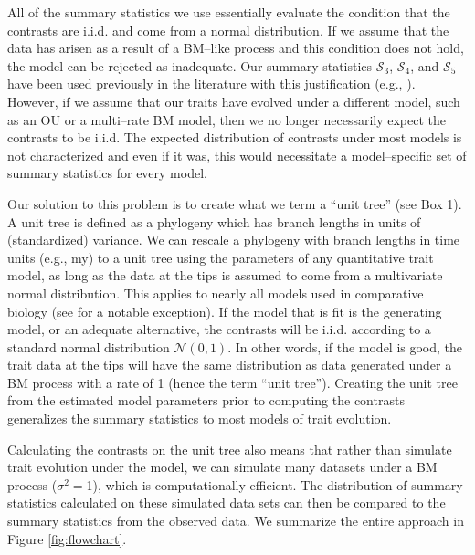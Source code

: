 \documentclass[a4paper,12pt]{article}
\begin{document}
All of the summary statistics we use essentially evaluate the condition that the contrasts are i.i.d. and come from a normal distribution. If we assume that the data has arisen as a result of a BM--like process and this condition does not hold, the model can be rejected as inadequate. Our summary statistics $\mathcal{S}_3$, $\mathcal{S}_4$, and $\mathcal{S}_5$ have been used previously in the literature with this justification (e.g., \citep{Garland1992, Garland1993,  Diaz1996}). However, if we assume that our traits have evolved under a different model, such as an OU or a multi--rate BM model, then we no longer necessarily expect the contrasts to be i.i.d. The expected distribution of contrasts under most models is not characterized and even if it was, this would necessitate a model--specific set of summary statistics for every model.

Our solution to this problem is to create what we term a ``unit tree'' (see Box 1). A unit tree is defined as a phylogeny which has branch lengths in units of (standardized) variance. We can rescale a phylogeny with branch lengths in time units (e.g., my) to a unit tree using the parameters of any quantitative trait model, as long as the data at the tips is assumed to come from a multivariate normal distribution. This applies to nearly all models used in comparative biology \citep{Omeara2012} (see \citep{Landis2012} for a notable exception). If the model that is fit is the generating model, or an adequate alternative, the contrasts will be i.i.d. according to a standard normal distribution $\mathcal{N}(0,1)$. In other words, if the model is good, the trait data at the tips will have the same distribution as data generated under a BM process with a rate of 1 (hence the term ``unit tree''). Creating the unit tree from the estimated model parameters prior to computing the contrasts generalizes the summary statistics to most models of trait evolution.

Calculating the contrasts on the unit tree also means that rather than simulate trait evolution under the model, we can simulate many datasets under a BM process ($\sigma^2 =$1), which is computationally efficient. The distribution of summary statistics calculated on these simulated data sets can then be compared to the summary statistics from the observed data. We summarize the entire approach in Figure \ref{fig:flowchart}.
\end{document}

